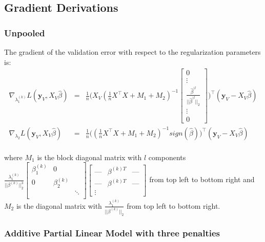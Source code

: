 \documentclass[10pt,letterpaper]{article}
\begin{document}
\subsection{Gradient Derivations}

\subsubsection{Unpooled 
}
The gradient of the validation error with respect to the regularization parameters is:
\begin{equation}
\begin{array}{lcl}
\nabla_{\lambda_1^{(k)}} L(\boldsymbol y_V, X_V \hat \beta) &=& 
\frac{1}{n}
\Bigg (
X_V
(\frac{1}{n} X^\top X + M_1 + M_2)^{-1}
\begin{bmatrix}
0 \\
\vdots \\
\frac{\hat\beta^{(l}}{||\hat\beta^{(l}||_2}\\
\vdots\\
0
\end{bmatrix}
\Bigg )^\top
(\boldsymbol y_V - X_V \hat \beta)
 \\
\nabla_{\lambda_2} L(\boldsymbol y_V, X_V \hat \beta) &=&
\frac{1}{n}
\Bigg (
(\frac{1}{n} X^\top X + M_1 + M_2)^{-1} sign(\hat \beta)
\Bigg )^\top
(\boldsymbol y_V - X_V \hat \beta)
\\ 
\end{array}
\end{equation}

where $M_1$ is the block diagonal matrix with $l$ components 
$
\frac{\lambda_1^{(k)}}{|| \beta^{(k)}||_2^3}
\begin{bmatrix} 
\beta_1^{(k)} & 0 & \\
0 & \beta_2^{(k)} &  \\
 &  & \ddots \\
\end{bmatrix}
\begin{bmatrix}
\text{---} & \beta^{(k)T} & \text{---} \\
\text{---} & \beta^{(k)T} & \text{---} \\
\vdots
\end{bmatrix}
$ from top left to bottom right and $M_2$ is the diagonal matrix with $\frac{\lambda_1^{(k)}}{|| \beta^{(k)}||_2}$ from top left to bottom right.

\subsubsection{Additive Partial Linear Model with three penalties}
\end{document}
